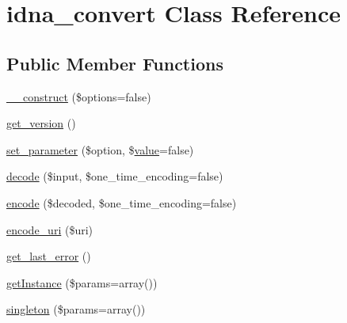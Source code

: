 \hypertarget{classidna__convert}{}\section{idna\+\_\+convert Class Reference}
\label{classidna__convert}
\subsection*{Public Member Functions}
\begin{DoxyCompactItemize}
\item 
\hyperlink{classidna__convert_a41c710240381df950f03e3a7e4648a1e}{\+\_\+\+\_\+construct} (\$options=false)
\item 
\hyperlink{classidna__convert_a59d30af851a16b87ac00a96931fe7e61}{get\+\_\+version} ()
\item 
\hyperlink{classidna__convert_a1efc37a8bd5f6b08eed75e0b8e6f074d}{set\+\_\+parameter} (\$option, \$\hyperlink{common_2js_2jquery_8js_abe5393d870043cf6aaa1d5ad5fce755c}{value}=false)
\item 
\hyperlink{classidna__convert_a845094b11b91976cea00bd9b9e022cd5}{decode} (\$input, \$one\+\_\+time\+\_\+encoding=false)
\item 
\hyperlink{classidna__convert_ae6e83c86d02d1ad9b8a7eb48435863bd}{encode} (\$decoded, \$one\+\_\+time\+\_\+encoding=false)
\item 
\hyperlink{classidna__convert_a21b3f0bb158b689c9d835bb1c7a30114}{encode\+\_\+uri} (\$uri)
\item 
\hyperlink{classidna__convert_adcf7a0902a83a834ce05fc34a460fccd}{get\+\_\+last\+\_\+error} ()
\item 
\hyperlink{classidna__convert_aff2ec039994038d13c8000addff58de3}{get\+Instance} (\$params=array())
\item 
\hyperlink{classidna__convert_a899f287645e43d1fd44a627cdb6b0e79}{singleton} (\$params=array())
\end{DoxyCompactItemize}
